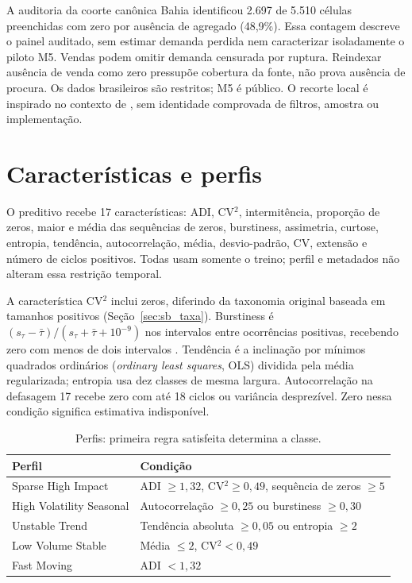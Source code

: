 A auditoria da coorte canônica Bahia identificou 2.697 de 5.510 células preenchidas com zero por ausência de agregado (48,9\%). Essa contagem descreve o painel auditado, sem estimar demanda perdida nem caracterizar isoladamente o piloto M5. Vendas podem omitir demanda censurada por ruptura. Reindexar ausência de venda como zero pressupõe cobertura da fonte, não prova ausência de procura. Os dados brasileiros são restritos; M5 é público. O recorte local é inspirado no contexto de \citet{Zabraoui2025GaDQN}, sem identidade comprovada de filtros, amostra ou implementação.

\section{Características e perfis}
\label{sec:carac_series}
O preditivo recebe 17 características: ADI, CV$^2$, intermitência, proporção de zeros, maior e média das sequências de zeros, burstiness, assimetria, curtose, entropia, tendência, autocorrelação, média, desvio-padrão, CV, extensão e número de ciclos positivos. Todas usam somente o treino; perfil e metadados não alteram essa restrição temporal.

A característica CV$^2$ inclui zeros, diferindo da taxonomia original baseada em tamanhos positivos (Seção~\ref{sec:sb_taxa}). Burstiness é $(s_\tau-\bar\tau)/(s_\tau+\bar\tau+10^{-9})$ nos intervalos entre ocorrências positivas, recebendo zero com menos de dois intervalos \citep{GohBarabasi2008Burstiness}. Tendência é a inclinação por mínimos quadrados ordinários (\textit{ordinary least squares}, OLS) dividida pela média regularizada; entropia usa dez classes de mesma largura. Autocorrelação na defasagem 17 recebe zero com até 18 ciclos ou variância desprezível. Zero nessa condição significa estimativa indisponível.

\begin{table}[htbp]\centering\small
\caption{Perfis: primeira regra satisfeita determina a classe.}\label{tab:pod}
\begin{tabular}{@{}p{4.2cm}p{8.2cm}@{}}\toprule
Perfil & Condição\\\midrule
Sparse High Impact & ADI $\geq1{,}32$, CV$^2\geq0{,}49$, sequência de zeros $\geq5$\\
High Volatility Seasonal & Autocorrelação $\geq0{,}25$ ou burstiness $\geq0{,}30$\\
Unstable Trend & Tendência absoluta $\geq0{,}05$ ou entropia $\geq2$\\
Low Volume Stable & Média $\leq2$, CV$^2<0{,}49$\\
Fast Moving & ADI $<1{,}32$\\\bottomrule
\end{tabular}\end{table}

